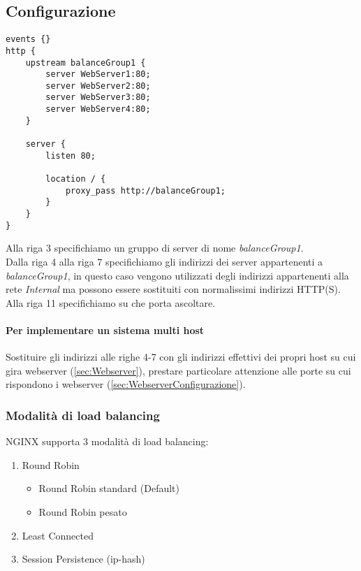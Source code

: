 \documentclass[../DocumentazioneProgetto.tex]{subfiles}
\begin{document}
	\subsection{Configurazione} 
	\begin{lstlisting}[caption=File di configurazione Load Balancer NGINX] 
events {}
http {
	upstream balanceGroup1 {
		server WebServer1:80;
		server WebServer2:80;
		server WebServer3:80;
		server WebServer4:80;
	}

	server {
		listen 80;
		
		location / {
			proxy_pass http://balanceGroup1;
		}
	}
}\end{lstlisting}
	Alla riga 3 specifichiamo un gruppo di server di nome \textit{balanceGroup1}.\\
	Dalla riga 4 alla riga 7 specifichiamo gli indirizzi dei server appartenenti a \textit{balanceGroup1}, in questo caso vengono
	utilizzati degli indirizzi appartenenti alla rete \textit{Internal} ma possono essere sostituiti con normalissimi indirizzi HTTP(S).\\
	Alla riga 11 specifichiamo su che porta ascoltare.
	\paragraph{Per implementare un sistema multi host} Sostituire gli indirizzi alle righe 4-7 con gli indirizzi effettivi dei propri host su cui gira webserver (\autoref{sec:Webserver}), prestare particolare attenzione alle porte su cui rispondono i webserver (\autoref{sec:WebserverConfigurazione}).
	\subsubsection{Modalità di load balancing} 
	NGINX supporta 3 modalità di load balancing:
	\begin{enumerate}
		\item Round Robin
		\begin{itemize}
			\item Round Robin standard (Default)
			\item Round Robin pesato
		\end{itemize}
		\item Least Connected
		\item Session Persistence (ip-hash)
	\end{enumerate}
\end{document}
